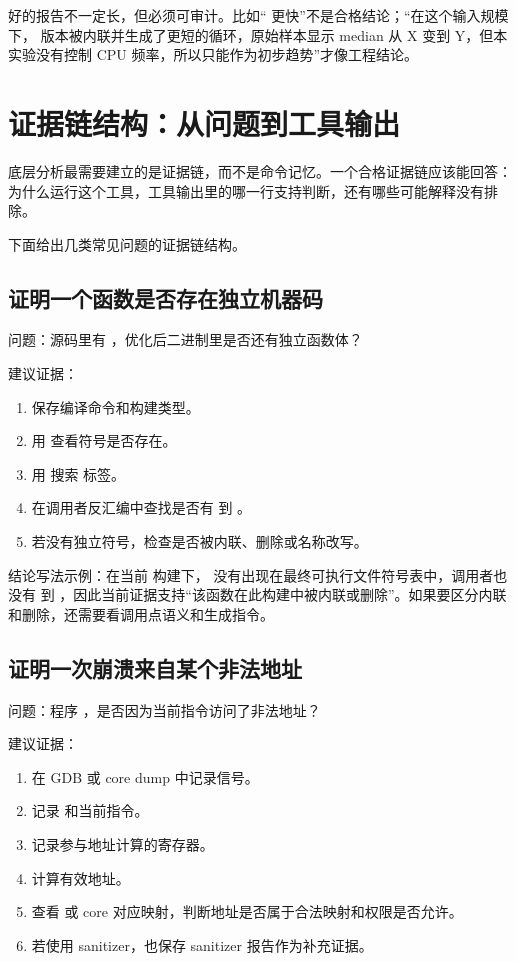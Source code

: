好的报告不一定长，但必须可审计。比如“ 更快”不是合格结论；“在这个输入规模下， 版本被内联并生成了更短的循环，原始样本显示 median 从 X 变到 Y，但本实验没有控制 CPU 频率，所以只能作为初步趋势”才像工程结论。

\section{证据链结构：从问题到工具输出}

底层分析最需要建立的是证据链，而不是命令记忆。一个合格证据链应该能回答：为什么运行这个工具，工具输出里的哪一行支持判断，还有哪些可能解释没有排除。

下面给出几类常见问题的证据链结构。

\subsection{证明一个函数是否存在独立机器码}

问题：源码里有 ，优化后二进制里是否还有独立函数体？

建议证据：

\begin{enumerate}
  \item 保存编译命令和构建类型。
  \item 用  查看符号是否存在。
  \item 用  搜索  标签。
  \item 在调用者反汇编中查找是否有  到 。
  \item 若没有独立符号，检查是否被内联、删除或名称改写。
\end{enumerate}

结论写法示例：在当前  构建下， 没有出现在最终可执行文件符号表中，调用者也没有  到 ，因此当前证据支持“该函数在此构建中被内联或删除”。如果要区分内联和删除，还需要看调用点语义和生成指令。

\subsection{证明一次崩溃来自某个非法地址}

问题：程序 ，是否因为当前指令访问了非法地址？

建议证据：

\begin{enumerate}
  \item 在 GDB 或 core dump 中记录信号。
  \item 记录  和当前指令。
  \item 记录参与地址计算的寄存器。
  \item 计算有效地址。
  \item 查看  或 core 对应映射，判断地址是否属于合法映射和权限是否允许。
  \item 若使用 sanitizer，也保存 sanitizer 报告作为补充证据。
\end{enumerate}

